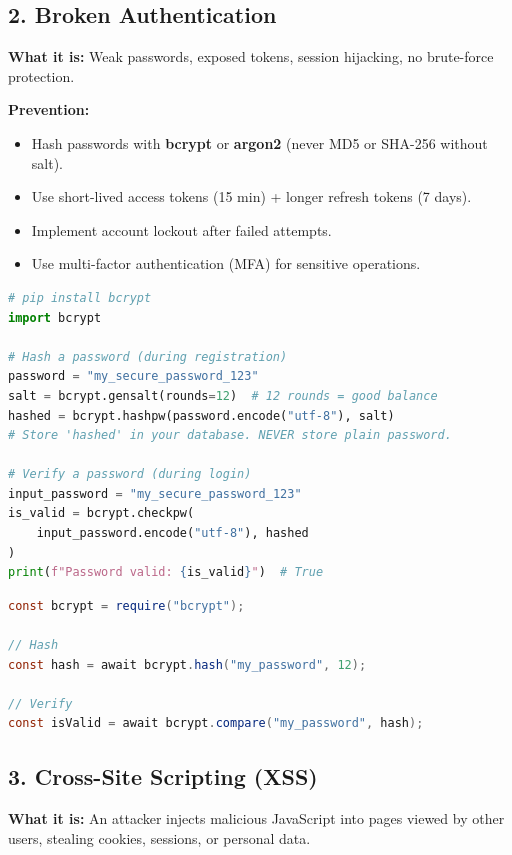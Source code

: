 \documentclass[12pt, a4paper, oneside]{book}
\begin{document}
\subsection{2. Broken Authentication}

\textbf{What it is:} Weak passwords, exposed tokens, session hijacking, no brute-force protection.

\textbf{Prevention:}
\begin{itemize}[leftmargin=2em]
    \item Hash passwords with \textbf{bcrypt} or \textbf{argon2} (never MD5 or SHA-256 without salt).
    \item Use short-lived access tokens (15 min) + longer refresh tokens (7 days).
    \item Implement account lockout after failed attempts.
    \item Use multi-factor authentication (MFA) for sensitive operations.
\end{itemize}

\begin{lstlisting}[language=Python, caption={Password hashing with bcrypt}]
# pip install bcrypt
import bcrypt

# Hash a password (during registration)
password = "my_secure_password_123"
salt = bcrypt.gensalt(rounds=12)  # 12 rounds = good balance
hashed = bcrypt.hashpw(password.encode("utf-8"), salt)
# Store 'hashed' in your database. NEVER store plain password.

# Verify a password (during login)
input_password = "my_secure_password_123"
is_valid = bcrypt.checkpw(
    input_password.encode("utf-8"), hashed
)
print(f"Password valid: {is_valid}")  # True
\end{lstlisting}

\begin{lstlisting}[language=Java, caption={Password hashing in Node.js}]
const bcrypt = require("bcrypt");

// Hash
const hash = await bcrypt.hash("my_password", 12);

// Verify
const isValid = await bcrypt.compare("my_password", hash);
\end{lstlisting}

\subsection{3. Cross-Site Scripting (XSS)}

\textbf{What it is:} An attacker injects malicious JavaScript into pages viewed by other users, stealing cookies, sessions, or personal data.
\end{document}
